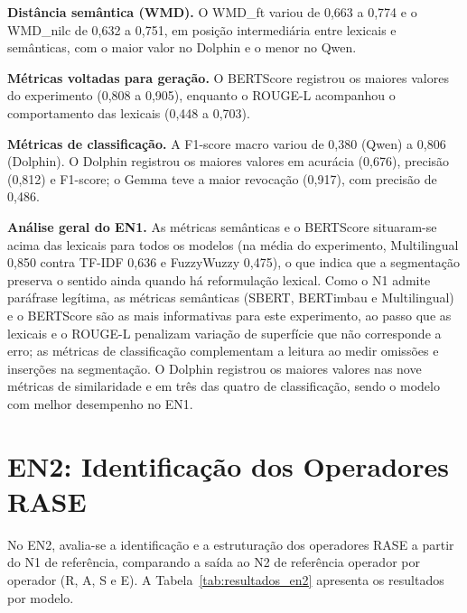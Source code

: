 \textbf{Distância semântica (WMD).} O WMD\_ft variou de 0{,}663 a 0{,}774 e o WMD\_nilc de 0{,}632 a 0{,}751, em posição intermediária entre lexicais e semânticas, com o maior valor no Dolphin e o menor no Qwen.

\textbf{Métricas voltadas para geração.} O BERTScore registrou os maiores valores do experimento (0{,}808 a 0{,}905), enquanto o ROUGE-L acompanhou o comportamento das lexicais (0{,}448 a 0{,}703).

\textbf{Métricas de classificação.} A F1-score macro variou de 0{,}380 (Qwen) a 0{,}806 (Dolphin). O Dolphin registrou os maiores valores em acurácia (0{,}676), precisão (0{,}812) e F1-score; o Gemma teve a maior revocação (0{,}917), com precisão de 0{,}486.

\textbf{Análise geral do EN1.} As métricas semânticas e o BERTScore situaram-se acima das lexicais para todos os modelos (na média do experimento, Multilingual 0{,}850 contra TF-IDF 0{,}636 e FuzzyWuzzy 0{,}475), o que indica que a segmentação preserva o sentido ainda quando há reformulação lexical. Como o N1 admite paráfrase legítima, as métricas semânticas (SBERT, BERTimbau e Multilingual) e o BERTScore são as mais informativas para este experimento, ao passo que as lexicais e o ROUGE-L penalizam variação de superfície que não corresponde a erro; as métricas de classificação complementam a leitura ao medir omissões e inserções na segmentação. O Dolphin registrou os maiores valores nas nove métricas de similaridade e em três das quatro de classificação, sendo o modelo com melhor desempenho no EN1.

\section{EN2: Identificação dos Operadores RASE}
\label{sec:res_en2}

No EN2, avalia-se a identificação e a estruturação dos operadores RASE a partir do N1 de referência, comparando a saída ao N2 de referência operador por operador (R, A, S e E). A Tabela~\ref{tab:resultados_en2} apresenta os resultados por modelo.

